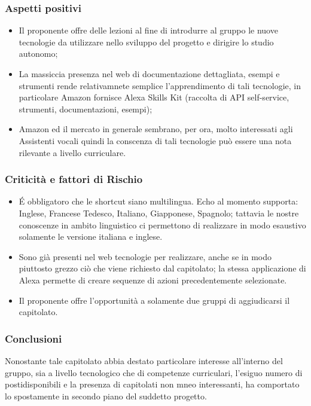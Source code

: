 \subsubsection{Aspetti positivi}
\begin{itemize}
    \item Il proponente offre delle lezioni al fine di introdurre al gruppo le
    nuove tecnologie da utilizzare nello sviluppo del progetto e dirigire lo studio autonomo;
    \item La massiccia presenza nel web di documentazione dettagliata, esempi e
    strumenti rende relativamnete semplice l'apprendimento di tali tecnologie,
    in particolare Amazon fornisce Alexa Skills Kit (raccolta di API
    self-service, strumenti, documentazioni, esempi);
    \item Amazon ed il mercato in generale sembrano, per ora, molto interessati
    agli Assistenti vocali quindi la conscenza di tali tecnologie può essere
    una nota rilevante a livello curriculare.
\end{itemize}
\subsubsection{Criticità e fattori di Rischio}
\begin{itemize}
    \item É obbligatoro che le shortcut siano multilingua. Echo al momento
    supporta: Inglese, Francese Tedesco, Italiano, Giapponese, Spagnolo;
    tattavia le nostre conoscenze in ambito linguistico ci permettono di
    realizzare in modo esaustivo solamente le versione italiana e inglese.
    \item Sono già presenti nel web tecnologie per realizzare, anche se in modo
    piuttosto grezzo ciò che viene richiesto dal capitolato; la stessa
    applicazione di Alexa permette di creare sequenze di azioni precedentemente
    selezionate.
    \item Il proponente offre l'opportunità a solamente due gruppi di
    aggiudicarsi il capitolato.
\end{itemize}
\subsubsection{Conclusioni}
Nonostante tale capitolato abbia destato particolare interesse all'interno del
gruppo, sia a livello tecnologico che di competenze curriculari, l'esiguo
numero di postidisponibili e la presenza di capitolati non mneo interessanti,
ha comportato lo spostamente in secondo piano del suddetto progetto.

